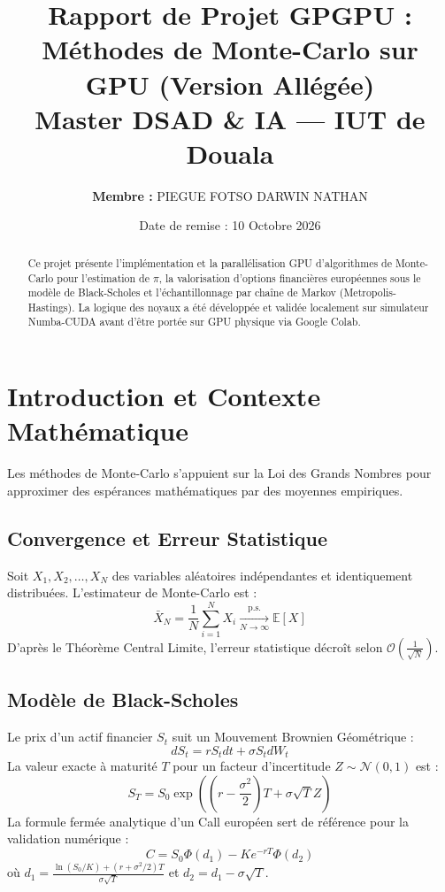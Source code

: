 \documentclass[12pt,a4paper]{article}
\title{\textbf{Rapport de Projet GPGPU : Méthodes de Monte-Carlo sur GPU (Version Allégée)}\\ \Large Master DSAD \& IA --- IUT de Douala}
\author{\textbf{Membre :} PIEGUE FOTSO DARWIN NATHAN}
\date{Date de remise : 10 Octobre 2026}
\begin{document}
\maketitle

\begin{abstract}
Ce projet présente l'implémentation et la parallélisation GPU d'algorithmes de Monte-Carlo pour l'estimation de \(\pi\), la valorisation d'options financières européennes sous le modèle de Black-Scholes et l'échantillonnage par chaîne de Markov (Metropolis-Hastings). La logique des noyaux a été développée et validée localement sur simulateur Numba-CUDA avant d'être portée sur GPU physique via Google Colab.
\end{abstract}

\section{Introduction et Contexte Mathématique}
Les méthodes de Monte-Carlo s'appuient sur la Loi des Grands Nombres pour approximer des espérances mathématiques par des moyennes empiriques.

\subsection{Convergence et Erreur Statistique}
Soit \(X_1, X_2, \dots, X_N\) des variables aléatoires indépendantes et identiquement distribuées. L'estimateur de Monte-Carlo est :
\begin{equation}
\bar{X}_N = \frac{1}{N} \sum_{i=1}^{N} X_i \xrightarrow[N \to \infty]{\text{p.s.}} \mathbb{E}[X]
\end{equation}
D'après le Théorème Central Limite, l'erreur statistique décroît selon \(\mathcal{O}\left(\frac{1}{\sqrt{N}}\right)\).

\subsection{Modèle de Black-Scholes}
Le prix d'un actif financier \(S_t\) suit un Mouvement Brownien Géométrique :
\begin{equation}
dS_t = r S_t dt + \sigma S_t dW_t
\end{equation}
La valeur exacte à maturité \(T\) pour un facteur d'incertitude \(Z \sim \mathcal{N}(0, 1)\) est :
\begin{equation}
S_T = S_0 \exp\left( \left(r - \frac{\sigma^2}{2}\right)T + \sigma\sqrt{T}Z \right)
\end{equation}
La formule fermée analytique d'un Call européen sert de référence pour la validation numérique :
\begin{equation}
C = S_0 \Phi(d_1) - K e^{-rT} \Phi(d_2)
\end{equation}
où \(d_1 = \frac{\ln(S_0/K) + (r + \sigma^2/2)T}{\sigma\sqrt{T}}\) et \(d_2 = d_1 - \sigma\sqrt{T}\).
\end{document}
